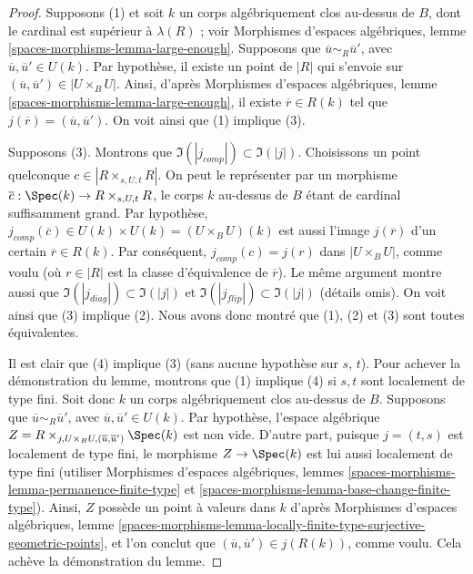 \begin{proof}
\medskip\noindent
Supposons (1) et soit $k$ un corps algébriquement clos au-dessus de $B$, dont le
cardinal est supérieur à $\lambda(R)$ ; voir
Morphismes d'espaces algébriques, lemme \ref{spaces-morphisms-lemma-large-enough}.
Supposons que $\overline{u} \sim_R \overline{u}'$, avec
$\overline{u}, \overline{u}' \in U(k)$. Par hypothèse, il existe
un point de $|R|$ qui s'envoie sur $(\overline{u}, \overline{u}') \in |U \times_B U|$.
Ainsi, d'après
Morphismes d'espaces algébriques, lemme \ref{spaces-morphisms-lemma-large-enough},
il existe $\overline{r} \in R(k)$ tel que
$j(\overline{r}) = (\overline{u}, \overline{u}')$. On voit ainsi
que (1) implique (3).

\medskip\noindent
Supposons (3). Montrons que
$\Im(|j_{comp}|) \subset \Im(|j|)$. Choisissons un point quelconque
$c \in |R \times_{s, U, t} R|$. On peut le représenter par un morphisme
$\overline{c} : \Spec(k) \to R \times_{s, U, t} R$, le corps $k$ au-dessus de $B$
étant de cardinal suffisamment grand. Par hypothèse,
$j_{comp}(\overline{c}) \in U(k) \times U(k) = (U \times_B U)(k)$
est aussi l'image $j(\overline{r})$ d'un certain $\overline{r} \in R(k)$.
Par conséquent, $j_{comp}(c) = j(r)$ dans $|U \times_B U|$, comme voulu (où
$r \in |R|$ est la classe d'équivalence de $\overline{r}$). Le même argument
montre aussi que $\Im(|j_{diag}|) \subset \Im(|j|)$ et
$\Im(|j_{flip}|) \subset \Im(|j|)$ (détails omis).
On voit ainsi que (3) implique (2). Nous avons donc montré que
(1), (2) et (3) sont toutes équivalentes.

\medskip\noindent
Il est clair que (4) implique (3) (sans aucune hypothèse sur $s$, $t$).
Pour achever la démonstration du lemme, montrons que (1) implique (4) si $s, t$
sont localement de type fini. Soit donc $k$ un corps algébriquement clos
au-dessus de $B$. Supposons que $\overline{u} \sim_R \overline{u}'$, avec
$\overline{u}, \overline{u}' \in U(k)$. Par hypothèse, l'espace algébrique
$Z = R \times_{j, U \times_B U, (\overline{u}, \overline{u}')} \Spec(k)$
est non vide. D'autre part, puisque $j = (t, s)$ est localement de type fini,
le morphisme $Z \to \Spec(k)$ est lui aussi localement de type fini (utiliser
Morphismes d'espaces algébriques, lemmes \ref{spaces-morphisms-lemma-permanence-finite-type}
et \ref{spaces-morphisms-lemma-base-change-finite-type}).
Ainsi, $Z$ possède un point à valeurs dans $k$ d'après
Morphismes d'espaces algébriques, lemme
\ref{spaces-morphisms-lemma-locally-finite-type-surjective-geometric-points},
et l'on conclut que $(\overline{u}, \overline{u}') \in j(R(k))$,
comme voulu. Cela achève la démonstration du lemme.
\end{proof}

